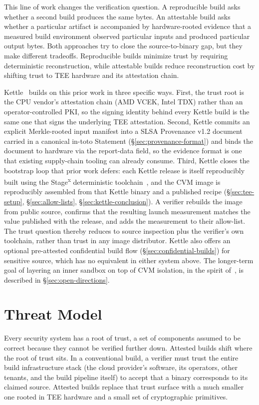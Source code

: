 \documentclass[11pt]{article}
\begin{document}
This line of work changes the verification question. A reproducible build asks whether a second build produces the same bytes. An attestable build asks whether a particular artifact is accompanied by hardware-rooted evidence that a measured build environment observed particular inputs and produced particular output bytes. Both approaches try to close the source-to-binary gap, but they make different tradeoffs. Reproducible builds minimize trust by requiring deterministic reconstruction, while attestable builds reduce reconstruction cost by shifting trust to TEE hardware and its attestation chain.

Kettle~\cite{ref:kettle} builds on this prior work in three specific ways. First, the trust root is the CPU vendor's attestation chain (AMD VCEK, Intel TDX) rather than an operator-controlled PKI, so the signing identity behind every Kettle build is the same one that signs the underlying TEE attestation. Second, Kettle commits an explicit Merkle-rooted input manifest into a SLSA Provenance v1.2 document carried in a canonical in-toto Statement (\S\ref{sec:provenance-format}) and binds the document to hardware via the report-data field, so the evidence format is one that existing supply-chain tooling can already consume. Third, Kettle closes the bootstrap loop that prior work defers: each Kettle release is itself reproducibly built using the Stage\textsuperscript{x} deterministic toolchain~\cite{ref:stagex}, and the CVM image is reproducibly assembled from that Kettle binary and a published recipe (\S\ref{sec:tee-setup}, \S\ref{sec:allow-lists}, \S\ref{sec:kettle-conclusion}). A verifier rebuilds the image from public source, confirms that the resulting launch measurement matches the value published with the release, and adds the measurement to their allow-list. The trust question thereby reduces to source inspection plus the verifier's own toolchain, rather than trust in any image distributor. Kettle also offers an optional pre-attested confidential build flow (\S\ref{sec:confidential-builds}) for sensitive source, which has no equivalent in either system above. The longer-term goal of layering an inner sandbox on top of CVM isolation, in the spirit of~\cite{ref:hugenroth}, is described in \S\ref{sec:open-directions}.

\section{Threat Model}

Every security system has a root of trust, a set of components assumed to be correct because they cannot be verified further down. Attested builds shift where the root of trust sits. In a conventional build, a verifier must trust the entire build infrastructure stack (the cloud provider's software, its operators, other tenants, and the build pipeline itself) to accept that a binary corresponds to its claimed source. Attested builds replace that trust surface with a much smaller one rooted in TEE hardware and a small set of cryptographic primitives.
\end{document}
